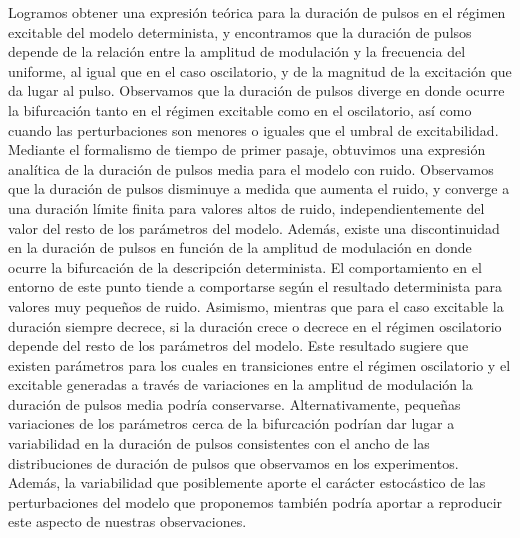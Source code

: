 \documentclass[./main.tex]{subfiles}
\begin{document}
Logramos obtener una expresión teórica para la duración de pulsos en el régimen excitable del modelo determinista, y encontramos que la duración de pulsos depende de la relación entre la amplitud de modulación y la frecuencia del uniforme, al igual que en el caso oscilatorio, y de la magnitud de la excitación que da lugar al pulso. Observamos que la duración de pulsos diverge en donde ocurre la bifurcación tanto en el régimen excitable como en el oscilatorio, así como cuando las perturbaciones son menores o iguales que el umbral de excitabilidad. Mediante el formalismo de tiempo de primer pasaje, obtuvimos una expresión analítica de la duración de pulsos media para el modelo con ruido. Observamos que la duración de pulsos disminuye a medida que aumenta el ruido, y converge a una duración límite finita para valores altos de ruido, independientemente del valor del resto de los parámetros del modelo. Además, existe una discontinuidad en la duración de pulsos en función de la amplitud de modulación en donde ocurre la bifurcación de la descripción determinista. El comportamiento en el entorno de este punto tiende a comportarse según el resultado determinista para valores muy pequeños de ruido. Asimismo, mientras que para el caso excitable la duración siempre decrece, si la duración crece o decrece en el régimen oscilatorio depende del resto de los parámetros del modelo. Este resultado sugiere que existen parámetros para los cuales en transiciones entre el régimen oscilatorio y el excitable generadas a través de variaciones en la amplitud de modulación la duración de pulsos media podría conservarse. Alternativamente, pequeñas variaciones de los parámetros cerca de la bifurcación podrían dar lugar a variabilidad en la duración de pulsos consistentes con el ancho de las distribuciones de duración de pulsos que observamos en los experimentos. Además, la variabilidad que posiblemente aporte el carácter estocástico de las perturbaciones del modelo que proponemos también podría aportar a reproducir este aspecto de nuestras observaciones. 
\end{document}

